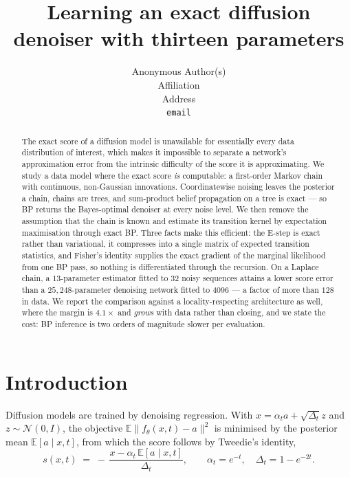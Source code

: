 \documentclass{article}
\title{Learning an exact diffusion denoiser with thirteen parameters}
\author{%
  Anonymous Author(s) \\
  Affiliation \\
  Address \\
  \texttt{email}
}
\begin{document}
\maketitle

\begin{abstract}
The exact score of a diffusion model is unavailable for essentially every data distribution
of interest, which makes it impossible to separate a network's approximation error from the
intrinsic difficulty of the score it is approximating. We study a data model where the exact
score \emph{is} computable: a first-order Markov chain with continuous, non-Gaussian
innovations. Coordinatewise noising leaves the posterior a chain, chains are trees, and
sum-product belief propagation on a tree is exact --- so BP returns the Bayes-optimal
denoiser at every noise level. We then remove the assumption that the chain is known and
estimate its transition kernel by expectation maximisation through exact BP. Three facts
make this efficient: the E-step is exact rather than variational, it compresses into a single
matrix of expected transition statistics, and Fisher's identity supplies the exact gradient
of the marginal likelihood from one BP pass, so nothing is differentiated through the
recursion. On a Laplace chain, a $13$-parameter estimator fitted to $32$ noisy sequences
attains a lower score error than a $25{,}248$-parameter denoising network fitted to $4096$
--- a factor of more than $128$ in data. We report the comparison against a
locality-respecting architecture as well, where the margin is $4.1\times$ and \emph{grows}
with data rather than closing, and we state the cost: BP inference is two orders of magnitude
slower per evaluation.
\end{abstract}

\section{Introduction}

Diffusion models are trained by denoising regression. With $x = \alpha_t a + \sqrt{\Delta_t}
z$ and $z \sim \mathcal{N}(0, I)$, the objective $\mathbb{E}\|f_\theta(x,t) - a\|^2$ is
minimised by the posterior mean $\mathbb{E}[a \mid x, t]$, from which the score follows by
Tweedie's identity,
\begin{equation}
\label{eq:tweedie}
s(x,t) \;=\; -\,\frac{x - \alpha_t\,\mathbb{E}[a \mid x, t]}{\Delta_t},
\qquad \alpha_t = e^{-t},\quad \Delta_t = 1 - e^{-2t}.
\end{equation}
\end{document}
